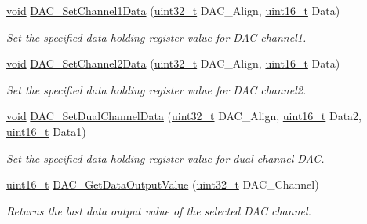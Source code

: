 \begin{DoxyCompactItemize}
\hyperlink{usb__devapi_8h_afabf60e7f57651d6d595a02c75f07cd0}{void} \hyperlink{group___d_a_c___private___functions_gad06b4230d2b17d1d13f41dce4c782461}{D\+A\+C\+\_\+\+Set\+Channel1\+Data} (\hyperlink{_p_e___types_8h_a33594304e786b158f3fb30289278f5af}{uint32\+\_\+t} D\+A\+C\+\_\+\+Align, \hyperlink{_p_e___types_8h_a1f1825b69244eb3ad2c7165ddc99c956}{uint16\+\_\+t} Data)
\begin{DoxyCompactList}\small\item\em Set the specified data holding register value for D\+AC channel1. \end{DoxyCompactList}\item 
\hyperlink{usb__devapi_8h_afabf60e7f57651d6d595a02c75f07cd0}{void} \hyperlink{group___d_a_c___private___functions_ga44e12006ec186791378d132da8541552}{D\+A\+C\+\_\+\+Set\+Channel2\+Data} (\hyperlink{_p_e___types_8h_a33594304e786b158f3fb30289278f5af}{uint32\+\_\+t} D\+A\+C\+\_\+\+Align, \hyperlink{_p_e___types_8h_a1f1825b69244eb3ad2c7165ddc99c956}{uint16\+\_\+t} Data)
\begin{DoxyCompactList}\small\item\em Set the specified data holding register value for D\+AC channel2. \end{DoxyCompactList}\item 
\hyperlink{usb__devapi_8h_afabf60e7f57651d6d595a02c75f07cd0}{void} \hyperlink{group___d_a_c___private___functions_ga4ca2cfdf56ab35a23f2517f23d7fbb24}{D\+A\+C\+\_\+\+Set\+Dual\+Channel\+Data} (\hyperlink{_p_e___types_8h_a33594304e786b158f3fb30289278f5af}{uint32\+\_\+t} D\+A\+C\+\_\+\+Align, \hyperlink{_p_e___types_8h_a1f1825b69244eb3ad2c7165ddc99c956}{uint16\+\_\+t} Data2, \hyperlink{_p_e___types_8h_a1f1825b69244eb3ad2c7165ddc99c956}{uint16\+\_\+t} Data1)
\begin{DoxyCompactList}\small\item\em Set the specified data holding register value for dual channel D\+AC. \end{DoxyCompactList}\item 
\hyperlink{_p_e___types_8h_a1f1825b69244eb3ad2c7165ddc99c956}{uint16\+\_\+t} \hyperlink{group___d_a_c___private___functions_ga51274838de1e5dd012a82d7f44d7a50b}{D\+A\+C\+\_\+\+Get\+Data\+Output\+Value} (\hyperlink{_p_e___types_8h_a33594304e786b158f3fb30289278f5af}{uint32\+\_\+t} D\+A\+C\+\_\+\+Channel)
\begin{DoxyCompactList}\small\item\em Returns the last data output value of the selected D\+AC channel. \end{DoxyCompactList}\end{DoxyCompactItemize}
